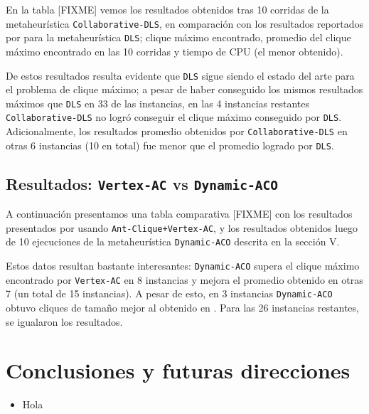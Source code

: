 \documentclass[conference]{IEEEtran}
\begin{document}
En la tabla [FIXME] vemos los resultados obtenidos tras 10 corridas
de la metaheurística \texttt{Collaborative-DLS}, en comparación con
los resultados reportados por \cite{dynamicl} para la metaheurística
\texttt{DLS}; clique máximo encontrado, promedio del clique máximo
encontrado en las 10 corridas y tiempo de CPU (el menor obtenido).


De estos resultados resulta evidente que \texttt{DLS} sigue siendo
el estado del arte para el problema de clique máximo; a pesar de
haber conseguido los mismos resultados máximos que \texttt{DLS}
en 33 de las instancias, en las 4 instancias restantes
\texttt{Collaborative-DLS} no logró conseguir el clique máximo
conseguido por \texttt{DLS}. Adicionalmente, los resultados promedio
obtenidos por \texttt{Collaborative-DLS} en otras 6 instancias (10
en total) fue menor que el promedio logrado por \texttt{DLS}.

\subsection{Resultados: \texttt{Vertex-AC} vs \texttt{Dynamic-ACO}}
\label{sec:aco_res}

A continuación presentamos una tabla comparativa [FIXME] con los resultados
presentados por \cite{aco2} usando \texttt{Ant-Clique+Vertex-AC}, y los
resultados obtenidos luego de 10 ejecuciones de la metaheurística
\texttt{Dynamic-ACO} descrita en la sección V.


Estos datos resultan bastante interesantes: \texttt{Dynamic-ACO}
supera el clique máximo encontrado por \texttt{Vertex-AC} en 8
instancias y mejora el promedio obtenido en otras 7 (un total de 15 
instancias). A pesar de esto, en 3 instancias \texttt{Dynamic-ACO}
obtuvo cliques de tamaño mejor al obtenido en \cite{aco2}. Para las
26 instancias restantes, se igualaron los resultados.

\section{Conclusiones y futuras direcciones}
\label{sec:conclusions}

\begin{itemize}
\item Hola
\end{itemize}








\end{document}
